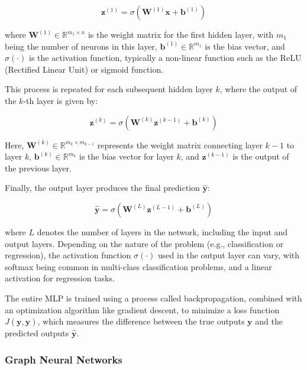 \[
\mathbf{z}^{(1)} = \sigma\left(\mathbf{W}^{(1)}\mathbf{x} + \mathbf{b}^{(1)}\right)
\]

where $\mathbf{W}^{(1)} \in \mathbb{R}^{m_1 \times n}$ is the weight matrix for the first hidden layer, with $m_1$ being the number of neurons in this layer, $\mathbf{b}^{(1)} \in \mathbb{R}^{m_1}$ is the bias vector, and $\sigma(\cdot)$ is the activation function, typically a non-linear function such as the ReLU (Rectified Linear Unit) or sigmoid function.

This process is repeated for each subsequent hidden layer $k$, where the output of the $k$-th layer is given by:

\[
\mathbf{z}^{(k)} = \sigma\left(\mathbf{W}^{(k)}\mathbf{z}^{(k-1)} + \mathbf{b}^{(k)}\right)
\]

Here, $\mathbf{W}^{(k)} \in \mathbb{R}^{m_k \times m_{k-1}}$ represents the weight matrix connecting layer $k-1$ to layer $k$, $\mathbf{b}^{(k)} \in \mathbb{R}^{m_k}$ is the bias vector for layer $k$, and $\mathbf{z}^{(k-1)}$ is the output of the previous layer.

Finally, the output layer produces the final prediction $\mathbf{\hat{y}}$:

\[
\mathbf{\hat{y}} = \sigma\left(\mathbf{W}^{(L)}\mathbf{z}^{(L-1)} + \mathbf{b}^{(L)}\right)
\]

where $L$ denotes the number of layers in the network, including the input and output layers. Depending on the nature of the problem (e.g., classification or regression), the activation function $\sigma(\cdot)$ used in the output layer can vary, with softmax being common in multi-class classification problems, and a linear activation for regression tasks.

The entire MLP is trained using a process called backpropagation, combined with an optimization algorithm like gradient descent, to minimize a loss function $J(\mathbf{y}, \mathbf{\hat{y}})$, which measures the difference between the true outputs $\mathbf{y}$ and the predicted outputs $\mathbf{\hat{y}}$.


\begin{figure}
    \centering
    \setlength{}        
    \setlength{}
    \resizebox{\figurewidth}{\figureheight}{}
    \caption{}\label{fig:}
\end{figure}


\subsubsection{Graph Neural Networks}

